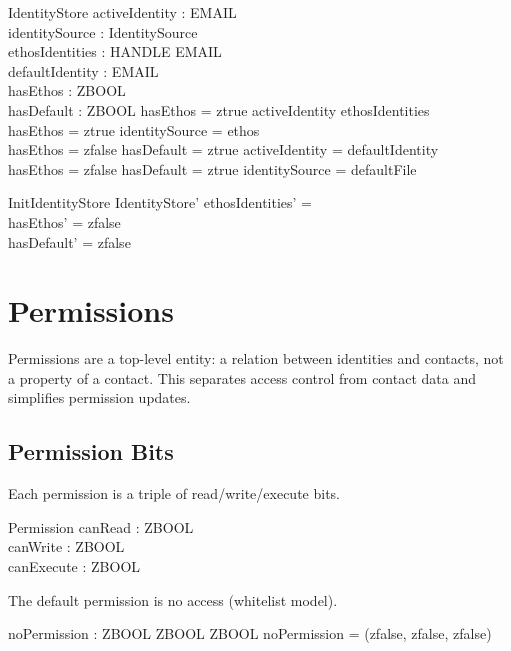 \documentclass[a4paper,10pt,fleqn]{article}
\begin{document}
\begin{schema}{IdentityStore}
activeIdentity : EMAIL \\
identitySource : IdentitySource \\
ethosIdentities : HANDLE \pfun EMAIL \\
defaultIdentity : EMAIL \\
hasEthos : ZBOOL \\
hasDefault : ZBOOL
\where
hasEthos = ztrue \implies activeIdentity \in \ran ethosIdentities \\
hasEthos = ztrue \implies identitySource = ethos \\
hasEthos = zfalse \land hasDefault = ztrue \implies
  activeIdentity = defaultIdentity \\
hasEthos = zfalse \land hasDefault = ztrue \implies
  identitySource = defaultFile
\end{schema}

\begin{schema}{InitIdentityStore}
IdentityStore'
\where
ethosIdentities' = \emptyset \\
hasEthos' = zfalse \\
hasDefault' = zfalse
\end{schema}

\section{Permissions}

Permissions are a top-level entity: a relation between identities and
contacts, not a property of a contact. This separates access control
from contact data and simplifies permission updates.

\subsection{Permission Bits}

Each permission is a triple of read/write/execute bits.

\begin{schema}{Permission}
canRead : ZBOOL \\
canWrite : ZBOOL \\
canExecute : ZBOOL
\end{schema}

The default permission is no access (whitelist model).

\begin{axdef}
noPermission : ZBOOL \cross ZBOOL \cross ZBOOL
\where
noPermission = (zfalse, zfalse, zfalse)
\end{axdef}
\end{document}

